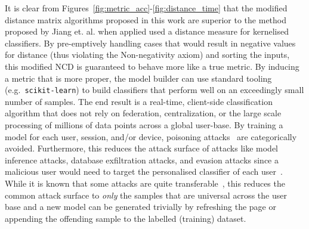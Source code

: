 \documentclass[preprint,12pt]{elsarticle}
\begin{document}
It is clear from Figures~\ref{fig:metric_acc}-\ref{fig:distance_time} that the modified distance matrix algorithms proposed in this work are superior to the method proposed by Jiang et. al. when applied used a distance measure for kernelised classifiers.
By pre-emptively handling cases that would result in negative values for distance (thus violating the Non-negativity axiom) and sorting the inputs, this modified NCD is guaranteed to behave more like a true metric.
By inducing a metric that is more proper, the model builder can use standard tooling (e.g.~\texttt{scikit-learn}) to build classifiers that perform well on an exceedingly small number of samples.
The end result is a real-time, client-side classification algorithm that does not rely on federation, centralization, or the large scale processing of millions of data points across a global user-base.
By training a model for each user, session, and/or device, poisoning attacks~\cite{biggio_poisoning_2013} are categorically avoided.
Furthermore, this reduces the attack surface of attacks like model inference attacks, database exfiltration attacks, and evasion attacks since a malicious user would need to target the personalised classifier of each user~\cite{biggio_evasion_2013,deepfool,chakraborty_adversarial_2018}.
While it is known that some attacks are quite transferable~\cite{wang2021enhancing}, this reduces the common attack surface to \textit{only} the samples that are universal across the user base and a new model can be generated trivially by refreshing the page or appending the offending sample to the labelled (training) dataset.



 
 





\end{document}
